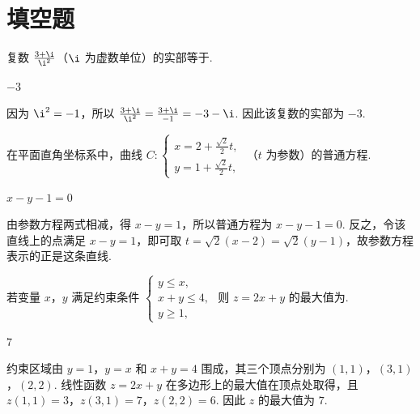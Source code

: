 \section{填空题}

\begin{problem}
复数 \(\frac{3 + \i}{\i^2}\)（\(\i\) 为虚数单位）的实部等于\fillinblank{}.
\end{problem}

\begin{answer}
\(-3\)
\end{answer}

\begin{solution}
因为 \(\i^2=-1\)，所以 \(\frac{3+\i}{\i^2}=\frac{3+\i}{-1}=-3-\i\). 因此该复数的实部为 \(-3\).
\end{solution}

\begin{problem}
在平面直角坐标系中，曲线 \(C: \begin{cases}
x = 2 + \frac{\sqrt{2}}{2} t,\\
y = 1 + \frac{\sqrt{2}}{2} t,
\end{cases}\) （\(t\) 为参数）的普通方程\fillinblank{}.
\end{problem}

\begin{answer}
\(x-y-1=0\)
\end{answer}

\begin{solution}
由参数方程两式相减，得 \(x-y=1\)，所以普通方程为 \(x-y-1=0\). 反之，令该直线上的点满足 \(x-y=1\)，即可取 \(t=\sqrt2(x-2)=\sqrt2(y-1)\)，故参数方程表示的正是这条直线.
\end{solution}

\begin{problem}
若变量 \(x\)，\(y\) 满足约束条件 \(\begin{cases}
y \leqslant x,\\
x + y \leqslant 4,\\
y \geqslant 1,
\end{cases}\) 则 \(z = 2x + y\) 的最大值为\fillinblank{}.
\end{problem}

\begin{answer}
\(7\)
\end{answer}

\begin{solution}
约束区域由 \(y=1\)，\(y=x\) 和 \(x+y=4\) 围成，其三个顶点分别为 \((1,1)\)，\((3,1)\)，\((2,2)\). 线性函数 \(z=2x+y\) 在多边形上的最大值在顶点处取得，且 \(z(1,1)=3\)，\(z(3,1)=7\)，\(z(2,2)=6\). 因此 \(z\) 的最大值为 \(7\).
\end{solution}

